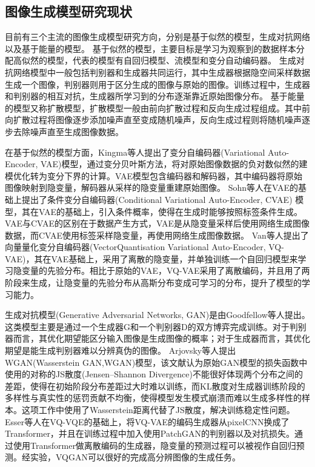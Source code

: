 \subsection{图像生成模型研究现状}
目前有三个主流的图像生成模型研究方向，分别是基于似然的模型，生成对抗网络以及基于能量的模型\cite{luoUnderstandingDiffusionModels2022}。
基于似然的模型，主要目标是学习为观察到的数据样本分配高似然的模型，代表的模型有自回归模型、流模型和变分自动编码器。
生成对抗网络模型中一般包括判别器和生成器共同运行，其中生成器根据隐空间采样数据生成一个图像，判别器则用于区分生成的图像与原始的图像。训练过程中，生成器和判别器的相互对抗，生成器所学习到的分布逐渐靠近原始图像分布。
基于能量的模型又称扩散模型，扩散模型一般由前向扩散过程和反向生成过程组成。其中前向扩散过程将图像逐步添加噪声直至变成随机噪声，反向生成过程则将随机噪声逐步去除噪声直至生成图像数据。
\par
在基于似然的模型方面，Kingma\cite{kingmaAutoEncodingVariationalBayes2022}等人提出了变分自编码器(Variational Auto-Encoder, VAE)模型，通过变分贝叶斯方法，将对原始图像数据的负对数似然的建模优化转为变分下界的计算。VAE模型包含编码器和解码器，其中编码器将原始图像映射到隐变量，解码器从采样的隐变量重建原始图像。
Sohn\cite{sohnLearningStructuredOutput2015}等人在VAE的基础上提出了条件变分自编码器(Conditional Variational Auto-Encoder, CVAE) 模型，其在VAE的基础上，引入条件概率，使得在生成时能够按照标签条件生成。VAE与CVAE的区别在于数据产生方式，VAE是从隐变量采样后使用网络生成图像数据，而CVAE使用标签采样隐变量，再使用网络生成图像数据。
Van\cite{vandenoordNeuralDiscreteRepresentation2017}等人提出了向量量化变分自编码器(VectorQuantisation Variational Auto-Encoder, VQ-VAE)，其在VAE基础上，采用了离散的隐变量，并单独训练一个自回归模型来学习隐变量的先验分布。相比于原始的VAE，VQ-VAE采用了离散编码，并且用了两阶段来生成，让隐变量的先验分布从高斯分布变成可学习的分布，提升了模型的学习能力。
\par
生成对抗模型(Generative Adversarial Networks, GAN)是由Goodfellow\cite{goodfellowGenerativeAdversarialNetworks2014}等人提出。这类模型主要是通过一个生成器G和一个判别器D的双方博弈完成训练。对于判别器而言，其优化期望能区分输入图像是生成图像的概率；对于生成器而言，其优化期望是能生成判别器难以分辨真伪的图像。
Arjovsky\cite{arjovskyWassersteinGAN2017}等人提出WGAN(Wasserstein GAN,WGAN)模型，该文献认为原始GAN模型的损失函数中使用的对称的JS散度(Jensen–Shannon Divergence)不能很好体现两个分布之间的差距，使得在初始阶段分布差距过大时难以训练，而KL散度对生成器训练阶段的多样性与真实性的惩罚贡献不均衡，使得模型发生模式崩溃而难以生成多样性的样本。这项工作中使用了Wasserstein距离代替了JS散度，解决训练稳定性问题。
Esser\cite{esserTamingTransformersHighResolution2021}等人在VQ-VQE的基础上，将VQ-VAE的编码生成器从pixelCNN换成了Transformer，并且在训练过程中加入使用PatchGAN的判别器以及对抗损失。通过使用Transformer做离散编码的生成器，隐变量的预测过程可以被视作自回归预测。经实验，VQGAN可以很好的完成高分辨图像的生成任务。

